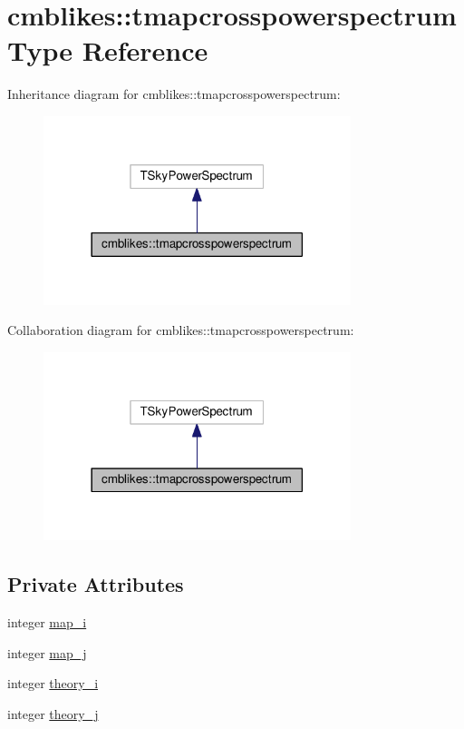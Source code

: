 \hypertarget{structcmblikes_1_1tmapcrosspowerspectrum}{}\section{cmblikes\+:\+:tmapcrosspowerspectrum Type Reference}
\label{structcmblikes_1_1tmapcrosspowerspectrum}


Inheritance diagram for cmblikes\+:\+:tmapcrosspowerspectrum\+:
\nopagebreak
\begin{figure}[H]
\begin{center}
\leavevmode
\includegraphics[width=254pt]{structcmblikes_1_1tmapcrosspowerspectrum__inherit__graph}
\end{center}
\end{figure}


Collaboration diagram for cmblikes\+:\+:tmapcrosspowerspectrum\+:
\nopagebreak
\begin{figure}[H]
\begin{center}
\leavevmode
\includegraphics[width=254pt]{structcmblikes_1_1tmapcrosspowerspectrum__coll__graph}
\end{center}
\end{figure}
\subsection*{Private Attributes}
\begin{DoxyCompactItemize}
\item 
integer \mbox{\hyperlink{structcmblikes_1_1tmapcrosspowerspectrum_a6b1b6ad343949fca9eb98759883de817}{map\+\_\+i}}
\item 
integer \mbox{\hyperlink{structcmblikes_1_1tmapcrosspowerspectrum_ace728a08d8a8d1a9e9a372beac6a828b}{map\+\_\+j}}
\item 
integer \mbox{\hyperlink{structcmblikes_1_1tmapcrosspowerspectrum_a8504981cdfa595d2f0cb80a352da7d6f}{theory\+\_\+i}}
\item 
integer \mbox{\hyperlink{structcmblikes_1_1tmapcrosspowerspectrum_a4a55d70d03e2c1261bbebd66cac1077f}{theory\+\_\+j}}
\end{DoxyCompactItemize}


